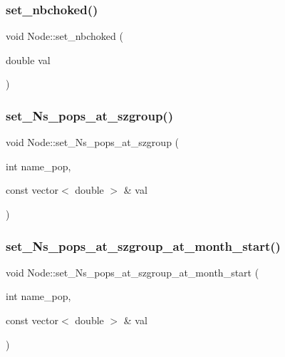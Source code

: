 \mbox{\label{class_node_a1de91a018aee7f94b1bf948ec86cfaf0}} 
\subsubsection{\texorpdfstring{set\_nbchoked()}{set\_nbchoked()}}
{\footnotesize\ttfamily void Node\+::set\+\_\+nbchoked (\begin{DoxyParamCaption}\item[{double}]{val }\end{DoxyParamCaption})}

\mbox{\label{class_node_a6a70f905da06efa6d8601e4b8fc5bd65}} 
\subsubsection{\texorpdfstring{set\_Ns\_pops\_at\_szgroup()}{set\_Ns\_pops\_at\_szgroup()}}
{\footnotesize\ttfamily void Node\+::set\+\_\+\+Ns\+\_\+pops\+\_\+at\+\_\+szgroup (\begin{DoxyParamCaption}\item[{int}]{name\+\_\+pop,  }\item[{const vector$<$ double $>$ \&}]{val }\end{DoxyParamCaption})}

\mbox{\label{class_node_ae8bd68a9bf60f92e5b3dbbee91662286}} 
\subsubsection{\texorpdfstring{set\_Ns\_pops\_at\_szgroup\_at\_month\_start()}{set\_Ns\_pops\_at\_szgroup\_at\_month\_start()}}
{\footnotesize\ttfamily void Node\+::set\+\_\+\+Ns\+\_\+pops\+\_\+at\+\_\+szgroup\+\_\+at\+\_\+month\+\_\+start (\begin{DoxyParamCaption}\item[{int}]{name\+\_\+pop,  }\item[{const vector$<$ double $>$ \&}]{val }\end{DoxyParamCaption})}

